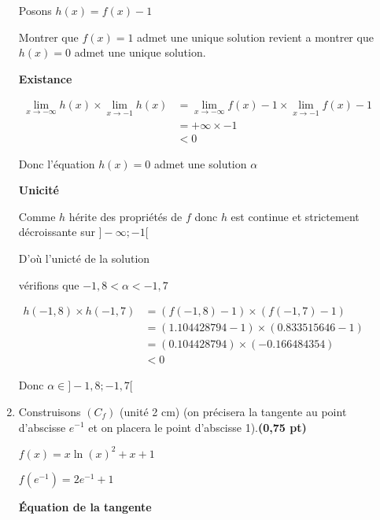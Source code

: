 \documentclass[12pt,a4paper]{article}
\begin{document}
\begin{enumerate}
          Posons \( h(x) = f(x) - 1 \)

          Montrer que \( f(x) = 1 \) admet une unique solution revient a montrer que \( h(x) = 0 \) admet une unique solution.

          \textbf{Existance}

          \(
          \begin{aligned}
              \lim\limits_{x\to -\infty}h(x) \times \lim\limits_{x\to -1}h(x) & = \lim\limits_{x\to -\infty}f(x)-1 \times \lim\limits_{x\to -1}f(x)-1 \\
                                                                              & =+\infty\times -1                                                     \\
                                                                              & <0
          \end{aligned}
          \)

          Donc l'équation \(h(x)=0\) admet une solution \(\alpha\)

          \textbf{Unicité}

          Comme \(h\) hérite des propriétés de \(f\) donc \(h\) est continue et strictement décroissante sur \( ]-\infty;-1[ \)

          D'où l'unicté de la solution

          vérifions que \(-1,8 < \alpha < -1,7\)

          \(
          \begin{aligned}
              h(-1,8) \times h(-1,7) & = (f(-1,8)-1) \times (f(-1,7)-1)      \\
                                     & =(1.104428794-1)\times(0.833515646-1) \\
                                     & =(0.104428794)\times(-0.166484354)    \\
                                     & <0
          \end{aligned}
          \)

          Donc \(\alpha \in ]-1,8;-1,7[ \)

    \item Construisons \( (C_f) \) (unité 2 cm) (on précisera la tangente au point d’abscisse \( e^{-1} \) et on placera le point d’abscisse 1).\hfill \textbf{(0,75 pt)}

          \( f(x)=x \ln(x)^2 + x + 1 \)

          \( f(e^{-1})=2e^{-1}+1 \)

          \textbf{Équation de la tangente}


\end{enumerate}
\end{document}
